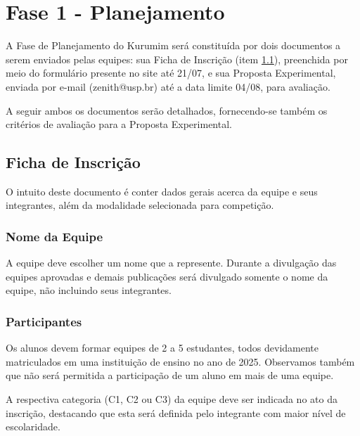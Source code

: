 \section{Fase 1 - Planejamento}\label{sec:planejamento}
    \par A Fase de Planejamento do Kurumim será constituída por dois documentos a serem 
    enviados pelas equipes: sua Ficha de Inscrição (item \ref{sec:ficha_inscricao}), preenchida por meio do formulário 
    presente no site até 21/07, e sua Proposta Experimental, enviada por e-mail (zenith@usp.br) 
    até a data limite 04/08, para avaliação.

    A seguir ambos os documentos serão detalhados, fornecendo-se também os critérios de avaliação para a Proposta Experimental.

    \subsection{Ficha de Inscrição}\label{sec:ficha_inscricao}
        O intuito deste documento é conter dados gerais acerca da equipe e seus integrantes, além da modalidade selecionada para competição.
    
        \subsubsection{Nome da Equipe}
            A equipe deve escolher um nome que a represente. Durante a divulgação das equipes aprovadas e demais publicações será divulgado somente o nome da equipe, não incluindo seus integrantes.
            
        \subsubsection{Participantes}
            Os alunos devem formar equipes de 2 a 5 estudantes, todos 
            devidamente matriculados em uma instituição de ensino no ano de 2025. Observamos também que não será permitida a participação de um aluno em mais de uma equipe.

            A respectiva categoria (C1, C2 ou C3) da equipe deve ser indicada no ato da inscrição, destacando que esta será definida pelo integrante com maior nível de escolaridade. 
                
    
